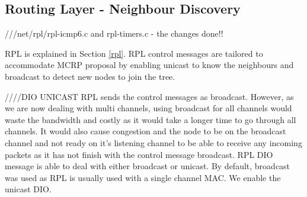 



\subsection{Routing Layer - Neighbour Discovery}
///net/rpl/rpl-icmp6.c and rpl-timers.c - the changes done!!

RPL is explained in Section \ref{rpl}. RPL control messages are tailored to accommodate MCRP proposal by enabling unicast to know the neighbours and broadcast to detect new nodes to join the tree.



////DIO UNICAST
RPL sends the control messages as broadcast. However, as we are now dealing with multi channels, using broadcast for all channels would waste the bandwidth and costly as it would take a longer time to go through all channels. It would also cause congestion and the node to be on the broadcast channel and not ready on it's listening channel to be able to receive any incoming packets as it has not finish with the control message broadcast. RPL DIO message is able to deal with either broadcast or unicast. By default, broadcast was used as RPL is usually used with a single channel MAC. We enable the unicast DIO.

